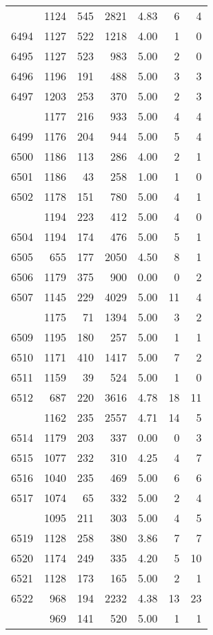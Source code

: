 \documentclass[
]{article}
\begin{document}
\begin{table}
\begin{tabular}[t]{lrrrrrr}
\addlinespace
6493 & 1124 & 545 & 2821 & 4.83 & 6 & 4\\
6494 & 1127 & 522 & 1218 & 4.00 & 1 & 0\\
6495 & 1127 & 523 & 983 & 5.00 & 2 & 0\\
6496 & 1196 & 191 & 488 & 5.00 & 3 & 3\\
6497 & 1203 & 253 & 370 & 5.00 & 2 & 3\\
\addlinespace
6498 & 1177 & 216 & 933 & 5.00 & 4 & 4\\
6499 & 1176 & 204 & 944 & 5.00 & 5 & 4\\
6500 & 1186 & 113 & 286 & 4.00 & 2 & 1\\
6501 & 1186 & 43 & 258 & 1.00 & 1 & 0\\
6502 & 1178 & 151 & 780 & 5.00 & 4 & 1\\
\addlinespace
6503 & 1194 & 223 & 412 & 5.00 & 4 & 0\\
6504 & 1194 & 174 & 476 & 5.00 & 5 & 1\\
6505 & 655 & 177 & 2050 & 4.50 & 8 & 1\\
6506 & 1179 & 375 & 900 & 0.00 & 0 & 2\\
6507 & 1145 & 229 & 4029 & 5.00 & 11 & 4\\
\addlinespace
6508 & 1175 & 71 & 1394 & 5.00 & 3 & 2\\
6509 & 1195 & 180 & 257 & 5.00 & 1 & 1\\
6510 & 1171 & 410 & 1417 & 5.00 & 7 & 2\\
6511 & 1159 & 39 & 524 & 5.00 & 1 & 0\\
6512 & 687 & 220 & 3616 & 4.78 & 18 & 11\\
\addlinespace
6513 & 1162 & 235 & 2557 & 4.71 & 14 & 5\\
6514 & 1179 & 203 & 337 & 0.00 & 0 & 3\\
6515 & 1077 & 232 & 310 & 4.25 & 4 & 7\\
6516 & 1040 & 235 & 469 & 5.00 & 6 & 6\\
6517 & 1074 & 65 & 332 & 5.00 & 2 & 4\\
\addlinespace
6518 & 1095 & 211 & 303 & 5.00 & 4 & 5\\
6519 & 1128 & 258 & 380 & 3.86 & 7 & 7\\
6520 & 1174 & 249 & 335 & 4.20 & 5 & 10\\
6521 & 1128 & 173 & 165 & 5.00 & 2 & 1\\
6522 & 968 & 194 & 2232 & 4.38 & 13 & 23\\
\addlinespace
6523 & 969 & 141 & 520 & 5.00 & 1 & 1\\

\end{tabular}
\end{table}
\end{document}
